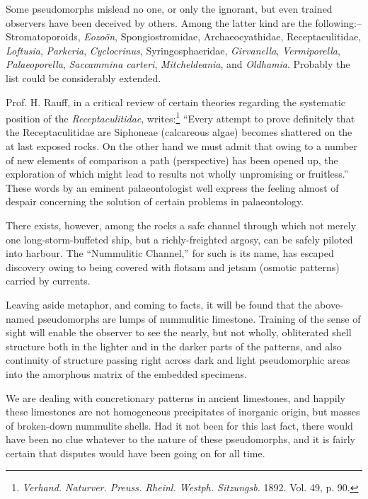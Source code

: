 \documentclass[a4paper, 12pt, oneside]{article}
\begin{document}
Some pseudomorphs mislead no one, or only the ignorant, but even trained observers have been deceived by others. Among the latter kind are the following:-- Stromatoporoids, \emph{Eozoön}, Spongiostromidae, Archaeocyathidae, Receptaculitidae, \emph{Loftusia}, \emph{Parkeria}, \emph{Cyclocrinus}, Syringosphaeridae, \emph{Girvanella}, \emph{Vermiporella}, \emph{Palaeoporella}, \emph{Saccammina carteri}, \emph{Mitcheldeania}, and \emph{Oldhamia}. Probably the list could be considerably extended.

Prof. H. Rauff, in a critical review of certain theories regarding the systematic position of the \emph{Receptaculitidae}, writes:\footnote{\emph{Verhand. Naturver. Preuss. Rheinl. Westph. Sitzungsb.} 1892. Vol. 49, p. 90.} ``Every attempt to prove definitely that the Receptaculitidae are Siphoneae (calcareous algae) becomes shattered on the at last exposed rocks. On the other hand we must admit that owing to a number of new elements of comparison a path (perspective) has been opened up, the exploration of which might lead to results not wholly unpromising or fruitless.'' These words by an eminent palaeontologist well express the feeling almost of despair concerning the solution of certain problems in palaeontology.

There exists, however, among the rocks a safe channel through which not merely one long-storm-buffeted ship, but a richly-freighted argosy, can be safely piloted into harbour. The ``Nummulitic Channel,'' for such is its name, has escaped discovery owing to being covered with flotsam and jetsam (osmotic patterns) carried by currents.

Leaving aside metaphor, and coming to facts, it will be found that the above-named pseudomorphs are lumps of nummulitic limestone. Training of the sense of sight will enable the observer to see the nearly, but not wholly, obliterated shell structure both in the lighter and in the darker parts of the patterns, and also continuity of structure passing right across dark and light pseudomorphic areas into the amorphous matrix of the embedded specimens.

We are dealing with concretionary patterns in ancient limestones, and happily these limestones are not homogeneous precipitates of inorganic origin, but masses of broken-down nummulite shells. Had it not been for this last fact, there would have been no clue whatever to the nature of these pseudomorphs, and it is fairly certain that disputes would have been going on for all time.
\end{document}
